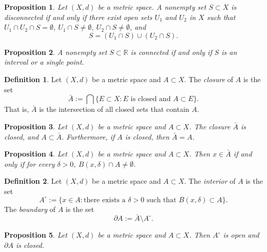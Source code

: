 \documentclass{article}
\newtheorem{proposition}{Proposition}[section]
\theoremstyle{definition}
\newtheorem{definition}{Definition}[section]
\theoremstyle{remark}
\begin{document}
\begin{proposition} \label{prop:disconnected_set}
Let \( (X, d) \) be a metric space. A nonempty set \( S \subset X \) is disconnected if and only if there exist open sets \( U_1 \) and \( U_2 \) in \( X \) such that \( U_1 \cap U_2 \cap S = \emptyset \), \( U_1 \cap S \neq \emptyset \), \( U_2 \cap S \neq \emptyset \), and
\[
S = (U_1 \cap S) \cup (U_2 \cap S).
\]
\end{proposition}

\begin{proposition} \label{prop:connected_real_set}
A nonempty set \( S \subset \mathbb{R} \) is connected if and only if \( S \) is an interval or a single point.
\end{proposition}

\begin{definition} \label{def:closure}
Let \( (X, d) \) be a metric space and \( A \subset X \). The \textit{closure} of \( A \) is the set
\[
\bar{A} := \bigcap \{E \subset X : E \text{ is closed and } A \subset E\}.
\]
That is, \( \bar{A} \) is the intersection of all closed sets that contain \( A \).
\end{definition}

\begin{proposition} \label{prop:closure_properties}
Let \( (X, d) \) be a metric space and \( A \subset X \). The closure \( \bar{A} \) is closed, and \( A \subset \bar{A} \). Furthermore, if \( A \) is closed, then \( \bar{A} = A \).
\end{proposition}

\begin{proposition} \label{prop:closure_characterization}
Let \( (X, d) \) be a metric space and \( A \subset X \). Then \( x \in \bar{A} \) if and only if for every \( \delta > 0 \), \( B(x, \delta) \cap A \neq \emptyset \).
\end{proposition}

\begin{definition} \label{def:interior_boundary}
Let \( (X, d) \) be a metric space and \( A \subset X \). The \textit{interior} of \( A \) is the set
\[
A^{\circ} := \{ x \in A : \text{there exists a } \delta > 0 \text{ such that } B(x, \delta) \subset A \}.
\]
The \textit{boundary} of \( A \) is the set
\[
\partial A := \bar{A} \setminus A^{\circ}.
\]
\end{definition}

\begin{proposition} \label{prop:interior_boundary}
Let \( (X, d) \) be a metric space and \( A \subset X \). Then \( A^{\circ} \) is open and \( \partial A \) is closed.
\end{proposition}
\end{document}
